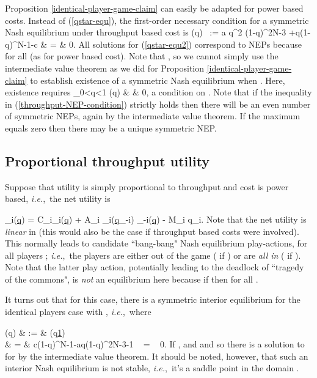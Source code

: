 \documentclass[12pt,onecolumn,draftcls]{IEEEtran}
\newcommand{\ie}{{\em i.e.},~}
\newcommand{\uq}{\underline{q}}
\newcommand{\uone}{\underline{1}}
\newcommand{\be}{}
\begin{document}
Proposition \ref{identical-player-game-claim} can easily be
adapted for power based
costs.  Instead of (\ref{qstar-equ}), the
first-order necessary condition for a symmetric Nash equilibrium 
under throughput based cost  is
\be\label{qstar-equ2}
(q) ~:= a q^2  (1-q)^{2N-3} +q(1-q)^{N-1}-c & = & 0.
\ee
All solutions  for (\ref{qstar-equ2}) correspond to NEPs  because
 for all  
(as for power based cost).
Note that 
, so we cannot simply use the intermediate
value theorem as we did for Proposition \ref{identical-player-game-claim}
to establish existence of a symmetric Nash equilibrium when .  Here,
existence requires 
\be\label{throughput-NEP-condition}
\max_{0<q<1} (q) & \geq & 0,
\ee
a condition on .
Note that if the inequality in (\ref{throughput-NEP-condition}) strictly
holds then there will be an even number of symmetric NEPs, again by the
intermediate value theorem. If the maximum equals zero then there may be a
unique symmetric NEP.

\subsection{Proportional throughput utility}

Suppose that utility is simply proportional to throughput and cost is power
based, \ie the net utility is
\be
{}_i(\uq)   =   
C_i\gamma_i(\uq)  + A_i \alpha_i(\uq_{-i})
\overline{\gamma}_{-i}(\uq) - M_i q_i.
\label{alt-util3}
\ee
Note that  the  net utility  is {\em linear} in  (this
would also be the case if throughput based costs were involved).  This
normally leads to candidate ``bang-bang" Nash equilibrium play-actions,
 for all players ; \ie the players are either out of the
game ( if ) or are {\em all in}
( if ).  Note that  the latter
play action, potentially leading to the deadlock of ``tragedy of the
commons", is {\em not} an equilibrium here because if  then
 for all .

It turns out that for  this case, there is a symmetric interior equilibrium
 for the identical players case with , \ie where
\be
{}(q) & := & (q\uone) \nonumber\\
& = &  c(1-q)^{N-1}-aq(1-q)^{2N-3}-1   ~ = ~  0.
\label{qstar-equ3}
\ee
If ,  and  and so there is a
solution to  for  by the intermediate value theorem.
It should be noted, however, that such an interior Nash equilibrium
 is not stable, \ie it's a saddle  point in the domain .
\end{document}

